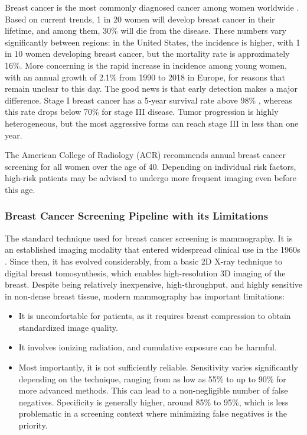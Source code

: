 \documentclass[12pt]{article}
\begin{document}
Breast cancer is the most commonly diagnosed cancer among women worldwide \cite{iarc2025}. 
Based on current trends, 1 in 20 women will develop breast cancer in their lifetime, and among them, 30\% will die from the disease.
These numbers vary significantly between regions: in the United States, the incidence is higher, with 1 in 10 women developing breast cancer, but the mortality rate is approximately 16\%.
More concerning is the rapid increase in incidence among young women, with an annual growth of 2.1\% from 1990 to 2018 in Europe, for reasons that remain unclear to this day.
The good news is that early detection makes a major difference. 
Stage I breast cancer has a 5-year survival rate above 98\% \cite{nbc_mammo}, whereas this rate drops below 70\% for stage III disease.
Tumor progression is highly heterogeneous, but the most aggressive forms can reach stage III in less than one year.
\vspace{0.5cm}

The American College of Radiology (ACR) recommends annual breast cancer screening for all women over the age of 40. 
Depending on individual risk factors, high-risk patients may be advised to undergo more frequent imaging even before this age.

\subsubsection{Breast Cancer Screening Pipeline with its Limitations}

The standard technique used for breast cancer screening is mammography. 
It is an established imaging modality that entered widespread clinical use in the 1960s \cite{komen_stats}. 
Since then, it has evolved considerably, from a basic 2D X-ray technique to digital breast tomosynthesis, which enables high-resolution 3D imaging of the breast.
Despite being relatively inexpensive, high-throughput, and highly sensitive in non-dense breast tissue, modern mammography has important limitations:

\begin{itemize}
    \item It is uncomfortable for patients, as it requires breast compression to obtain standardized image quality.
    \item It involves ionizing radiation, and cumulative exposure can be harmful.
    \item Most importantly, it is not sufficiently reliable. Sensitivity varies significantly depending on the technique, ranging from as low as 55\% to up to 90\% for more advanced methods.
    This can lead to a non-negligible number of false negatives.
    Specificity is generally higher, around 85\% to 95\%, which is less problematic in a screening context where minimizing false negatives is the priority.
\end{itemize}
\end{document}
